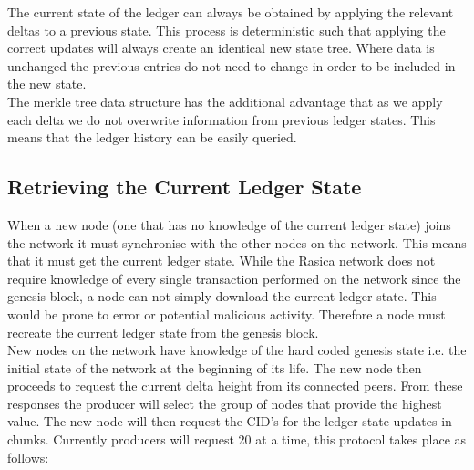 The current state of the ledger can always be obtained by applying the relevant deltas to a previous state. This process is deterministic such that applying the correct updates will always create an identical new state tree. Where data is unchanged the previous entries do not need to change in order to be included in the new state.\\

The merkle tree data structure has the additional advantage that as we apply each delta we do not overwrite information from previous ledger states. This means that the ledger history can be easily queried. \\

\subsection{Retrieving the Current Ledger State}

When a new node (one that has no knowledge of the current ledger state) joins the network it must synchronise with the other nodes on the network. This means that it must get the current ledger state. While the Rasica network does not require knowledge of every single transaction performed on the network since the genesis block, a node can not simply download the current ledger state. This would be prone to error or potential malicious activity. Therefore a node must recreate the current ledger state from the genesis block. \\

New nodes on the network have knowledge of the hard coded genesis state i.e. the initial state of the network at the beginning of its life. The new node then proceeds to request the current delta height from its connected peers. From these responses the producer will select the group of nodes that provide the highest value. The new node will then request the CID's for the ledger state updates in chunks. Currently producers will request 20 at a time, this protocol takes place as follows: \\

